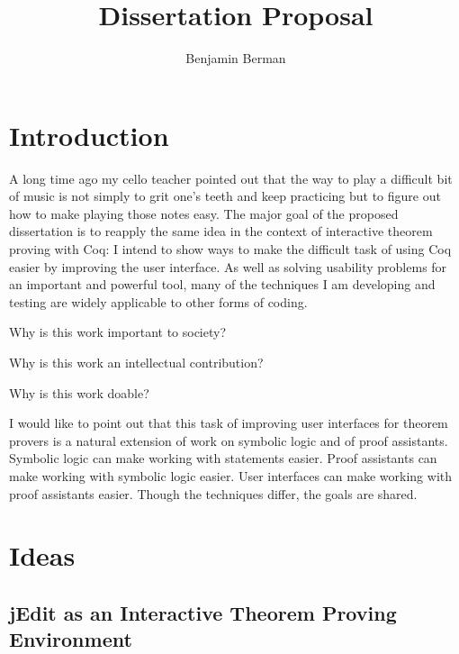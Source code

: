 \documentclass[11pt]{amsart}
\title{Dissertation Proposal}
\author{Benjamin Berman}
\begin{document}
\maketitle
\section{Introduction}

A long time ago my cello teacher pointed out that the way to play a difficult bit of music is not simply to grit one's teeth and keep practicing but to figure out how to make playing those notes easy.  The major goal of the proposed dissertation is to reapply the same idea in the context of interactive theorem proving with Coq:  I intend to show ways to make the difficult task of using Coq easier by improving the user interface.  As well as solving usability problems for an important and powerful tool, many of the techniques I am developing and testing are widely applicable to other forms of coding.


Why is this work important to society?

Why is this work an intellectual contribution?

Why is this work doable?

I would like to point out that this task of improving user interfaces for theorem provers is a natural extension of work on symbolic logic and of proof assistants.  Symbolic logic can make working with statements easier.  Proof assistants can make working with symbolic logic easier.  User interfaces can make working with proof assistants easier.  Though the techniques differ, the goals are shared.

\section{Ideas}

\subsection{jEdit as an Interactive Theorem Proving Environment}
\end{document}
